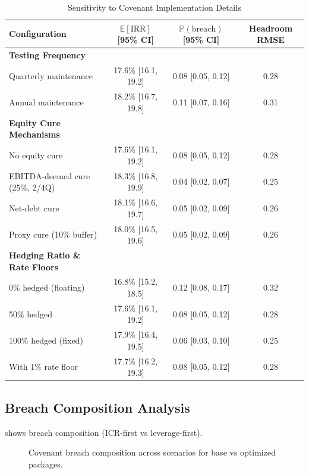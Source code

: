 \documentclass[11pt,a4paper]{article}
\newcommand{\E}{\mathbb{E}}
\newcommand{\Prob}{\mathbb{P}}
\numberwithin{equation}{section}
\theoremstyle{plain}
\theoremstyle{definition}
\begin{document}
\begin{table}[h]
\centering
\caption{Sensitivity to Covenant Implementation Details}
\begin{tabular}{lccc}
\toprule
Configuration & $\E[\mathrm{IRR}]$ [95\% CI] & $\Prob(\text{breach})$ [95\% CI] & Headroom RMSE \\
\midrule
\textbf{Testing Frequency} & & & \\
Quarterly maintenance & 17.6\% [16.1, 19.2] & 0.08 [0.05, 0.12] & 0.28 \\
Annual maintenance & 18.2\% [16.7, 19.8] & 0.11 [0.07, 0.16] & 0.31 \\
\textbf{Equity Cure Mechanisms} & & & \\
No equity cure & 17.6\% [16.1, 19.2] & 0.08 [0.05, 0.12] & 0.28 \\
EBITDA-deemed cure (25\%, 2/4Q) & 18.3\% [16.8, 19.9] & 0.04 [0.02, 0.07] & 0.25 \\
Net-debt cure & 18.1\% [16.6, 19.7] & 0.05 [0.02, 0.09] & 0.26 \\
Proxy cure (10\% buffer) & 18.0\% [16.5, 19.6] & 0.05 [0.02, 0.09] & 0.26 \\
\textbf{Hedging Ratio \& Rate Floors} & & & \\
0\% hedged (floating) & 16.8\% [15.2, 18.5] & 0.12 [0.08, 0.17] & 0.32 \\
50\% hedged & 17.6\% [16.1, 19.2] & 0.08 [0.05, 0.12] & 0.28 \\
100\% hedged (fixed) & 17.9\% [16.4, 19.5] & 0.06 [0.03, 0.10] & 0.25 \\
With 1\% rate floor & 17.7\% [16.2, 19.3] & 0.08 [0.05, 0.12] & 0.28 \\
\bottomrule
\end{tabular}
\label{tab:sensitivity}
\end{table}

\subsection{Breach Composition Analysis}

 shows breach composition (ICR-first vs leverage-first).

\begin{figure}[h]
\centering
{}
\caption{Covenant breach composition across scenarios for base vs optimized packages.}
\label{fig:breach_composition}
\end{figure}
\end{document}
